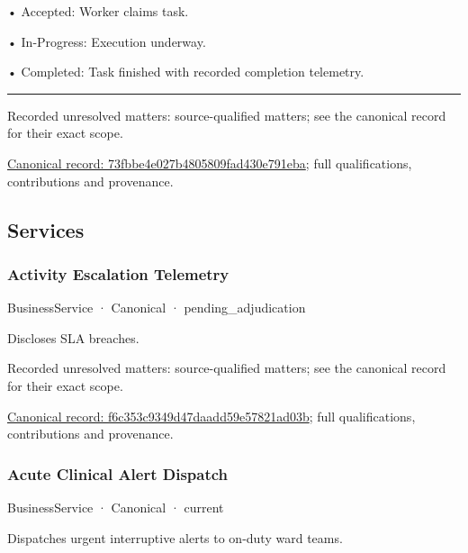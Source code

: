 •
Accepted: Worker claims task.



•
In-Progress: Execution underway.



•
Completed: Task finished with recorded completion telemetry.



\medskip\hrule\medskip

{\small Recorded unresolved matters: source-qualified matters; see the canonical record for their exact scope.}\par
{\footnotesize \href{../../../../continuum/business/business-process/73fbbe4e027b4805809fad430e791eba.md}{Canonical record: 73fbbe4e027b4805809fad430e791eba}; full qualifications, contributions and provenance.}\par
\subsection{Services}

\subsubsection{Activity Escalation Telemetry}

\label{element:f6c353c9349d47daadd59e57821ad03b}
{\small BusinessService · Canonical · pending\_adjudication}\par

Discloses SLA breaches.


{\small Recorded unresolved matters: source-qualified matters; see the canonical record for their exact scope.}\par
{\footnotesize \href{../../../../continuum/business/business-service/f6c353c9349d47daadd59e57821ad03b.md}{Canonical record: f6c353c9349d47daadd59e57821ad03b}; full qualifications, contributions and provenance.}\par
\subsubsection{Acute Clinical Alert Dispatch}

\label{element:34d7f0bfff8f470bb97c00582f5e8a1d}
{\small BusinessService · Canonical · current}\par

Dispatches urgent interruptive alerts to on-duty ward teams.



